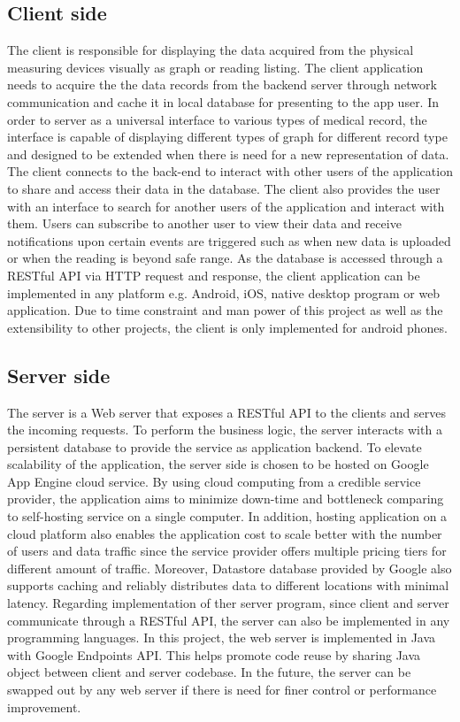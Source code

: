 \subsection{Client side}
The client is responsible for displaying the data acquired from the physical measuring devices visually as graph or
reading listing. The client application needs to acquire the the data records from the backend server through network
communication and cache it in local database for presenting to the app user. In order to server as a universal interface to
various types of medical record, the interface is capable of displaying different types of graph for different record
type and designed to be extended when there is need for a new representation of data. The client connects 
to the back-end to interact with other users of the application to share and access their data in the database. The
client also provides the user with an interface to search for another users of the application and interact with them.
Users can subscribe to another user to view their data and receive notifications upon certain events are triggered such
as when new data is uploaded or when the reading is beyond safe range. As the database is accessed through a RESTful API
via HTTP request and response, the client application can be implemented in any platform e.g. Android, iOS, native
desktop program or web application. Due to time constraint and man power of this project as well as the extensibility to
other projects, the client is only implemented for android phones.

\subsection{Server side}
The server is a Web server that exposes a RESTful API to the clients and serves the incoming requests. To perform the
business logic, the server interacts with a persistent database to provide the service as application backend. To
elevate scalability of the application, the server side is chosen to be hosted on Google App Engine cloud service. By
using cloud computing from a credible service provider, the application aims to minimize down-time and bottleneck
comparing to self-hosting service on a single computer.  In addition, hosting application on a cloud platform also
enables the application cost to scale better with the number of users and data traffic since the service provider offers
multiple pricing tiers for different amount of traffic.  Moreover, Datastore database provided by Google also supports
caching and reliably distributes data to different locations with minimal latency.  Regarding implementation of ther
server program, since client and server communicate through a RESTful API, the server can also be implemented in any
programming languages. In this project, the web server is implemented in Java with Google Endpoints API.  This helps
promote code reuse by sharing Java object between client and server codebase. In the future, the server can be swapped
out by any web server if there is need for finer control or performance improvement.

